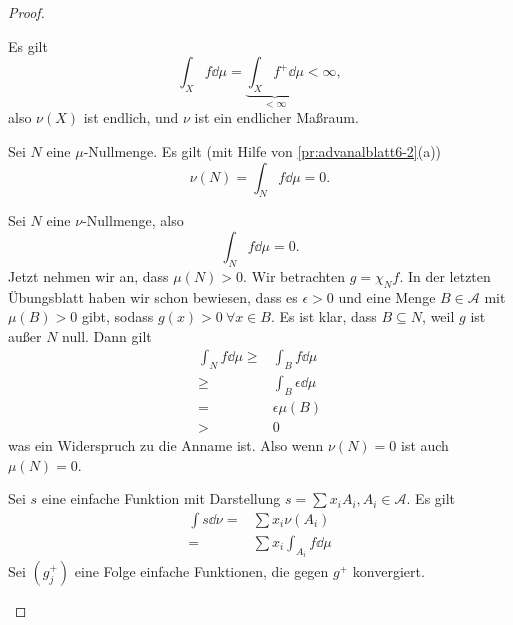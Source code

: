 \begin{proof}
\begin{parts}
\begin{enumerate}[label=(\roman*)]
			Es gilt
			\[
			\int_X f\dd{\mu}=\underbrace{\int_X f^+\dd{\mu}}_{<\infty}<\infty
			,\]
			also $\nu(X)$ ist endlich, und $\nu$ ist ein endlicher Maßraum.
		\end{enumerate}
	\item Sei $N$ eine $\mu$-Nullmenge. Es gilt (mit Hilfe von \ref{pr:advanalblatt6-2}(a)) 
		\[
			\nu(N)=\int_N f\dd{\mu}=0
		.\] 
	\item Sei $N$ eine $\nu$-Nullmenge, also
		\[
			\int_N f\dd{\mu}=0
		.\] 
		Jetzt nehmen wir an, dass $\mu(N)>0$. Wir betrachten $g=\chi_N f$. In der letzten Übungsblatt haben wir schon bewiesen, dass es $\epsilon>0$ und eine Menge $B\in\mathcal{A}$ mit $\mu(B)>0$ gibt, sodass $g(x)>0~\forall x\in B$. Es ist klar, dass $B\subseteq N$, weil $g$ ist außer $N$ null. Dann gilt
		\begin{align*}
			\int_N f\dd{\mu}\ge& \int_B f\dd{\mu}\\
			\ge& \int_B \epsilon\dd{\mu}\\
			=& \epsilon\mu(B)\\
			>&0
		\end{align*}
		was ein Widerspruch zu die Anname ist. Also wenn $\nu(N)=0$ ist auch $\mu(N)=0$.
	\item Sei $s$ eine einfache Funktion mit Darstellung $s=\sum x_i A_i, A_i\in \mathcal{A}$. Es gilt
		\begin{align*}
			\int s\dd{\nu}=& \sum x_i \nu(A_i)\\
			=& \sum x_i\int_{A_i}f\dd{\mu}
		\end{align*}
		Sei $(g_j^+)$ eine Folge einfache Funktionen, die gegen $ g^+$ konvergiert. 
	\end{parts}
\end{proof}
